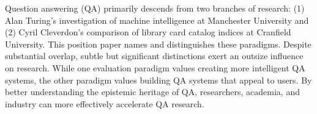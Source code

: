 Question answering (QA) primarily descends from two branches of research: (1) Alan Turing's investigation of machine intelligence at Manchester University and (2) Cyril Cleverdon's comparison of library card catalog indices at Cranfield University. This position paper names and distinguishes these paradigms. Despite substantial overlap, subtle but significant distinctions exert an outsize influence on research. While one evaluation paradigm values creating more intelligent QA systems, the other paradigm values building QA systems that appeal to users. By better understanding the epistemic heritage of QA, researchers, academia, and industry can more effectively accelerate QA research.
